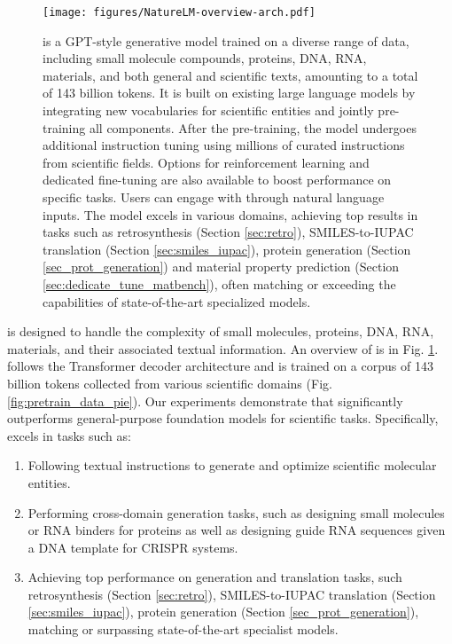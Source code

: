 \begin{figure}[!htbp]
    \centering
    \texttt{[image: figures/NatureLM-overview-arch.pdf]}
    \caption{\ourM{} is a GPT-style generative model trained on a diverse range of data, including small molecule compounds, proteins, DNA, RNA, materials, and both general and scientific texts, amounting to a total of 143 billion tokens. It is built on existing large language models by integrating new vocabularies for scientific entities and jointly pre-training all components. After the pre-training, the model undergoes additional instruction tuning using millions of curated instructions from scientific fields. Options for reinforcement learning and dedicated fine-tuning are also available to boost performance on specific tasks. Users can engage with \ourM{} through natural language inputs. The model excels in various domains, achieving top results in tasks such as retrosynthesis (Section \ref{sec:retro}), SMILES-to-IUPAC translation (Section \ref{sec:smiles_iupac}), protein generation (Section \ref{sec_prot_generation}) and material property prediction (Section \ref{sec:dedicate_tune_matbench}), often matching or exceeding the capabilities of state-of-the-art specialized models.}
    \label{fig:naturelm_overview}
\end{figure}

\ourM{} is designed to handle the complexity of small molecules, proteins, DNA, RNA, materials, and their associated textual information. An overview of \ourM{} is in Fig. \ref{fig:naturelm_overview}. \ourM{} follows the Transformer decoder architecture and is trained on a corpus of 143 billion tokens collected from various scientific domains (Fig. \ref{fig:pretrain_data_pie}). Our experiments demonstrate that \ourM{} significantly outperforms general-purpose foundation models for scientific tasks. Specifically, \ourM{} excels in tasks such as:
\begin{enumerate}
    \item Following textual instructions to generate and optimize scientific molecular entities.
\item Performing cross-domain generation tasks, such as designing small molecules or RNA binders for proteins as well as designing guide RNA sequences given a DNA template for CRISPR systems.
\item  Achieving top performance on generation and translation tasks, such retrosynthesis (Section \ref{sec:retro}), SMILES-to-IUPAC translation (Section \ref{sec:smiles_iupac}), protein generation (Section \ref{sec_prot_generation}), matching or surpassing state-of-the-art specialist models. %
\end{enumerate}

